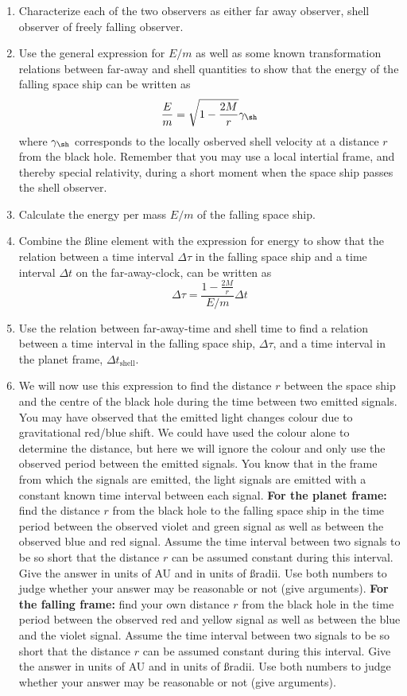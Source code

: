 {\begin{multicols}{2}
\begin{enumerate}
\item Characterize each of the two observers as either far away observer, shell observer of freely falling observer.
\item Use the general expression for $E/m$ as well as some known transformation relations between far-away and shell quantities to show that the energy of the falling space ship can be written as
\[
\frac{E}{m}=\sqrt{1-\frac{2M}{r}}\gamma_\sh
\]
where $\gamma_\sh$ corresponds to the locally osberved shell velocity at a distance $r$ from the black hole. Remember that you may use a local intertial frame, and thereby special relativity, during a short moment when the space ship passes the shell observer.
\item Calculate the energy per mass $E/m$ of the falling space ship.
\item Combine the \ss line element with the expression for energy to show that the relation between a time interval $\Delta\tau$ in the falling space ship and a time interval $\Delta t$ on the far-away-clock, can be written as
\[
\Delta\tau = \frac{1-\frac{2M}{r}}{E/m}\Delta t
\]
\item Use the relation between far-away-time and shell time to find a relation between a time interval in the falling space ship, $\Delta\tau$, and a time interval in the planet frame, $\Delta t_\mathrm{shell}$.
\item We will now use this expression to find the distance $r$ between the space ship and the centre of the black hole during the time between two emitted signals. You may have observed that the emitted light changes colour due to gravitational red/blue shift. We could have used the colour alone to determine the distance, but here we will ignore the colour and only use the observed period between the emitted signals. You know that in the frame from which the signals are emitted, the light signals are emitted with a constant known time interval between each signal. {\bf For the planet frame:} find the distance $r$ from the black hole to the falling space ship in the time period between the observed violet and green signal as well as between the observed blue and red signal. Assume the time interval between two signals to be so short that the distance $r$ can be assumed constant during this interval. Give the answer in units of AU and in units of \ss radii. Use both numbers to judge whether your answer may be reasonable or not (give arguments). {\bf For the falling frame:} find your own distance $r$ from the black hole in the time period between the observed red and yellow signal as well as between the blue and the violet signal. Assume the time interval between two signals to be so short that the distance $r$ can be assumed constant during this interval. Give the answer in units of AU and in units of \ss radii. Use both numbers to judge whether your answer may be reasonable or not (give arguments).

\end{enumerate}
\end{multicols}}
